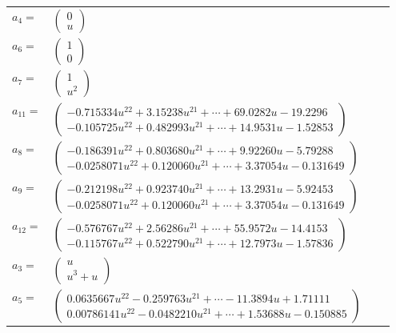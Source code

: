 \documentclass[1p]{elsarticle_modified}
\theoremstyle{definition}
\begin{document}
\begin{tabular}{m{7pt} m{180pt} m{7pt} m{180pt} }
\flushright $a_{4}=$&$\begin{pmatrix}0\\u\end{pmatrix}$ \\
\flushright $a_{6}=$&$\begin{pmatrix}1\\0\end{pmatrix}$ \\
\flushright $a_{7}=$&$\begin{pmatrix}1\\u^2\end{pmatrix}$ \\
\flushright $a_{11}=$&$\begin{pmatrix}-0.715334 u^{22}+3.15238 u^{21}+\cdots+69.0282 u-19.2296\\-0.105725 u^{22}+0.482993 u^{21}+\cdots+14.9531 u-1.52853\end{pmatrix}$ \\
\flushright $a_{8}=$&$\begin{pmatrix}-0.186391 u^{22}+0.803680 u^{21}+\cdots+9.92260 u-5.79288\\-0.0258071 u^{22}+0.120060 u^{21}+\cdots+3.37054 u-0.131649\end{pmatrix}$ \\
\flushright $a_{9}=$&$\begin{pmatrix}-0.212198 u^{22}+0.923740 u^{21}+\cdots+13.2931 u-5.92453\\-0.0258071 u^{22}+0.120060 u^{21}+\cdots+3.37054 u-0.131649\end{pmatrix}$ \\
\flushright $a_{12}=$&$\begin{pmatrix}-0.576767 u^{22}+2.56286 u^{21}+\cdots+55.9572 u-14.4153\\-0.115767 u^{22}+0.522790 u^{21}+\cdots+12.7973 u-1.57836\end{pmatrix}$ \\
\flushright $a_{3}=$&$\begin{pmatrix}u\\u^3+u\end{pmatrix}$ \\
\flushright $a_{5}=$&$\begin{pmatrix}0.0635667 u^{22}-0.259763 u^{21}+\cdots-11.3894 u+1.71111\\0.00786141 u^{22}-0.0482210 u^{21}+\cdots+1.53688 u-0.150885\end{pmatrix}$ \\

\end{tabular}
\end{document}

